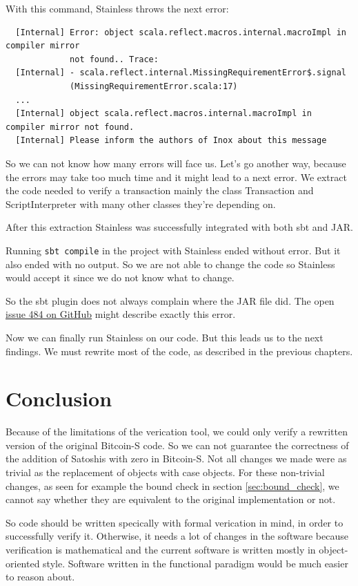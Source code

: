 \documentclass[runningheads]{llncs}
\begin{document}
With this command, Stainless throws the next error:
\begin{verbatim}
  [Internal] Error: object scala.reflect.macros.internal.macroImpl in compiler mirror
             not found.. Trace:
  [Internal] - scala.reflect.internal.MissingRequirementError$.signal
             (MissingRequirementError.scala:17)
  ...
  [Internal] object scala.reflect.macros.internal.macroImpl in compiler mirror not found.
  [Internal] Please inform the authors of Inox about this message
\end{verbatim}

So we can not know how many errors will face us.  Let's go another
way, because the errors may take too much time and it might lead to a
next error.  We extract the code needed to verify a transaction mainly
the class Transaction and ScriptInterpreter with many other classes
they're depending on.

After this extraction Stainless was successfully integrated with both
sbt and JAR.

Running \texttt{sbt compile} in the project with Stainless ended
without error.  But it also ended with no output.  So we are not able
to change the code so Stainless would accept it since we do not know
what to change.

So the sbt plugin does not always complain where the JAR file did.
The open
\href{https://github.com/epfl-lara/stainless/issues/484}{issue 484 on
  GitHub} might describe exactly this error.

Now we can finally run Stainless on our code.  But this leads us to
the next findings.  We must rewrite most of the code, as described in
the previous chapters.



\section{Conclusion}
\label{chap:conclusion}

Because of the limitations of the verication tool, we could only
verify a rewritten version of the original Bitcoin-S code.  So we can
not guarantee the correctness of the addition of Satoshis with zero in
Bitcoin-S.  Not all changes we made were as trivial as the replacement
of objects with case objects.  For these non-trivial changes, as seen
for example the bound check in section \ref{sec:bound_check}, we
cannot say whether they are equivalent to the original implementation
or not.

So code should be written specically with formal verication in mind,
in order to successfully verify it.  Otherwise, it needs a lot of
changes in the software because verification is mathematical and the
current software is written mostly in object-oriented style.  Software
written in the functional paradigm would be much easier to reason
about.
\end{document}
